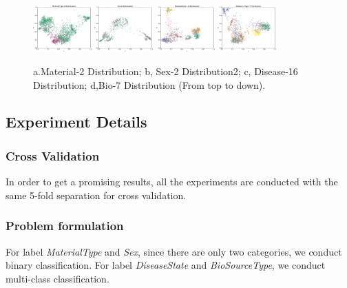 \documentclass[sigconf]{acmart}
\begin{document}
	\begin{figure}[]
		\centering
		\includegraphics[width=0.2\textwidth]{../figs/Material-2.pdf}
		\includegraphics[width=0.2\textwidth]{../figs/Sex-2.pdf}
		\includegraphics[width=0.2\textwidth]{../figs/Disease-16.pdf}
		\includegraphics[width=0.2\textwidth]{../figs/Bio-7.pdf}
		\caption{a.Material-2 Distribution;  b, Sex-2 Distribution2; c, Disease-16 Distribution; d,Bio-7 Distribution (From top to down). }
		\label{distribution_1}
		\centering
	\end{figure}
	
	\subsection{Experiment Details}
	\subsubsection{Cross Validation}
	In order to get a promising results, all the experiments are conducted with the same 5-fold separation for cross validation.  
	
	\subsubsection{Problem formulation}
	For label \textit{MaterialType} and \textit{Sex}, since there are only two categories, we conduct binary classification. For label \textit{DiseaseState} and \textit{BioSourceType}, we conduct multi-class classification.
	
\end{document}
